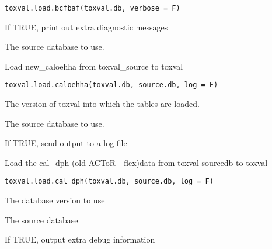 \documentclass[letterpaper]{book}
\begin{document}
%
\begin{Usage}
\begin{verbatim}
toxval.load.bcfbaf(toxval.db, verbose = F)
\end{verbatim}
\end{Usage}
%
\begin{Arguments}
\begin{ldescription}
\item[\code{verbose}] If TRUE, print out extra diagnostic messages

\item[\code{source.db}] The source database to use.
\end{ldescription}
\end{Arguments}
%
\begin{Description}\relax
Load new\_caloehha from toxval\_source to toxval
\end{Description}
%
\begin{Usage}
\begin{verbatim}
toxval.load.caloehha(toxval.db, source.db, log = F)
\end{verbatim}
\end{Usage}
%
\begin{Arguments}
\begin{ldescription}
\item[\code{toxval.db}] The version of toxval into which the tables are loaded.

\item[\code{source.db}] The source database to use.

\item[\code{log}] If TRUE, send output to a log file
\end{ldescription}
\end{Arguments}
%
\begin{Description}\relax
Load the cal\_dph (old ACToR - flex)data  from toxval sourcedb to toxval
\end{Description}
%
\begin{Usage}
\begin{verbatim}
toxval.load.cal_dph(toxval.db, source.db, log = F)
\end{verbatim}
\end{Usage}
%
\begin{Arguments}
\begin{ldescription}
\item[\code{toxval.db}] The database version to use

\item[\code{source.db}] The source database

\item[\code{verbose}] If TRUE, output extra debug information
\end{ldescription}
\end{Arguments}
\end{document}
